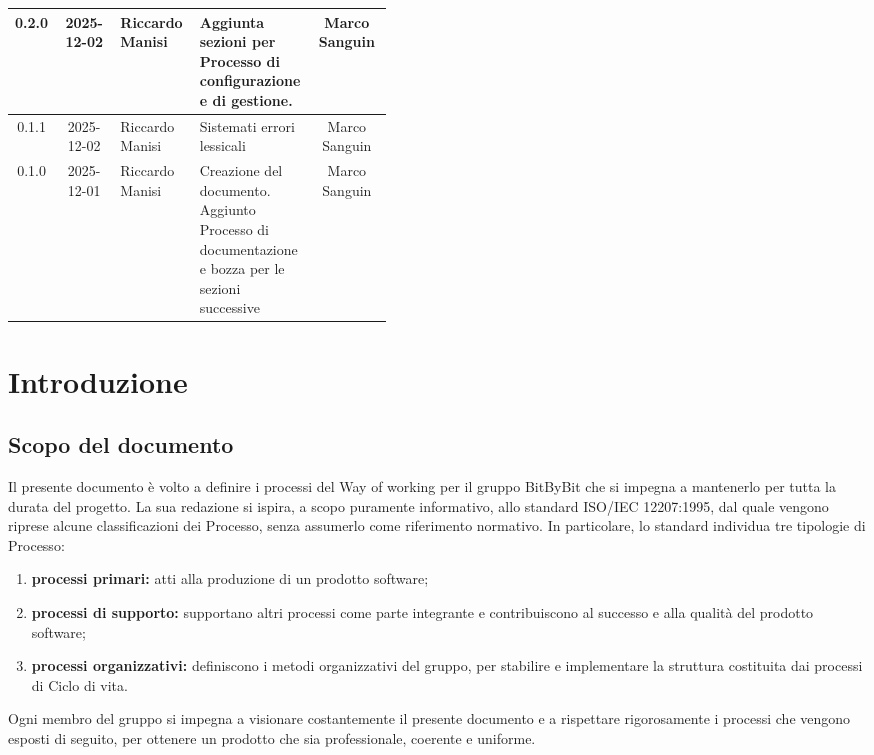 \documentclass[a4paper,12pt]{article}
\begin{document}
\begin{center}
\begin{longtable}{|c|c|>{\raggedright\arraybackslash}p{0.21\linewidth}|>{\raggedright\arraybackslash}p{0.23\linewidth}|c|}
\hline
\rowcolor{gray!20}
0.2.0 & 2025-12-02 & Riccardo Manisi & Aggiunta sezioni per Processo di configurazione e di gestione. & Marco Sanguin\\
\hline
\rowcolor{white}
0.1.1 & 2025-12-02 & Riccardo Manisi & Sistemati errori lessicali & Marco Sanguin\\
\hline
\rowcolor{gray!20}
0.1.0 & 2025-12-01 & Riccardo Manisi & Creazione del documento. Aggiunto Processo di documentazione e bozza per le sezioni successive & Marco Sanguin \\
\hline
\end{longtable}
\end{center}

\clearpage

\clearpage
\tableofcontents
\thispagestyle{empty} %
\clearpage

\listoftables
\thispagestyle{empty}
\clearpage

\section{Introduzione}
\subsection{Scopo del documento}
Il presente documento è volto a definire i processi del Way of working per il gruppo BitByBit che si impegna a mantenerlo per tutta la durata del progetto.
La sua redazione si ispira, a scopo puramente informativo, allo standard ISO/IEC 12207:1995, dal quale vengono riprese alcune classificazioni dei Processo, senza assumerlo come riferimento normativo. In particolare, lo standard individua tre tipologie di Processo:
\begin{enumerate}
    \item \textbf{processi primari:} atti alla produzione di un prodotto software;
    \item \textbf{processi di supporto:} supportano altri processi come parte integrante e contribuiscono al successo e alla qualità del prodotto software;
    \item \textbf{processi organizzativi:} definiscono i metodi organizzativi del gruppo, per stabilire e implementare la struttura costituita dai processi di Ciclo di vita.
\end{enumerate}
Ogni membro del gruppo si impegna a visionare costantemente il presente documento e a rispettare rigorosamente i processi che vengono esposti di seguito, per ottenere un prodotto che sia professionale, coerente e uniforme.
\end{document}
